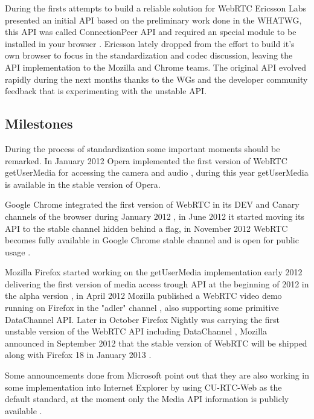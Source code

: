During the firsts attempts to build a reliable solution for WebRTC Ericsson Labs presented an initial API based on the preliminary work done in the WHATWG, this API was called ConnectionPeer API and required an special module to be installed in your browser \cite{ericssonwebrtc}. Ericsson lately dropped from the effort to build it's own browser to focus in the standardization and codec discussion, leaving the API implementation to the Mozilla and Chrome teams. The original API evolved rapidly during the next months thanks to the WGs and the developer community feedback that is experimenting with the unstable API.

\subsection{Milestones}

During the process of standardization some important moments should be remarked. In January 2012 Opera implemented the first version of WebRTC getUserMedia for accessing the camera and audio \cite{operaannouncement}, during this year getUserMedia is available in the stable version of Opera. 

Google Chrome integrated the first version of WebRTC in its DEV and Canary channels of the browser during January 2012 \cite{chromeannouncement}, in June 2012 it started moving its API to the stable channel hidden behind a flag, in November 2012 WebRTC becomes fully available in Google Chrome stable channel and is open for public usage \cite{chromestable}. 

Mozilla Firefox started working on the getUserMedia implementation early 2012 delivering the first version of media access trough API at the beginning of 2012 in the alpha version \cite{mozillablog}, in April 2012 Mozilla published a WebRTC video demo running on Firefox in the "adler" channel \cite{mozillawebrtc}, also supporting some primitive DataChannel API. Later in October Firefox Nightly was carrying the first unstable version of the WebRTC API including DataChannel \cite{mozillafinal}, Mozilla announced in September 2012 that the stable version of WebRTC will be shipped along with Firefox 18 in January 2013 \cite{mozillacomming}. 

Some announcements done from Microsoft point out that they are also working in some implementation into Internet Explorer by using CU-RTC-Web as the default standard, at the moment only the Media API information is publicly available \cite{microsoftcapture}.

